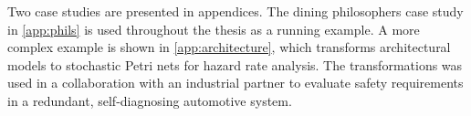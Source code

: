 Two case studies are presented in appendices. The dining philosophers case study in \cref{app:phils} is used throughout the thesis as a running example. A more complex example is shown in \cref{app:architecture}, which transforms architectural models to stochastic Petri nets for hazard rate analysis. The transformations was used in a collaboration with an industrial partner to evaluate safety requirements in a redundant, self-diagnosing automotive system.

